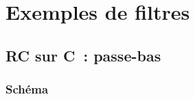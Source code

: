 \documentclass[../../main/main.tex]{subfiles}
\begin{document}
\section{Exemples de filtres}
\subsection{RC sur C~: passe-bas}
\subsubsection{Schéma}
\smallbreak
\noindent
\begin{minipage}{\linewidth}
	\begin{center}
		\vspace{-15pt}
	\end{center}
\end{minipage}
\end{document}
